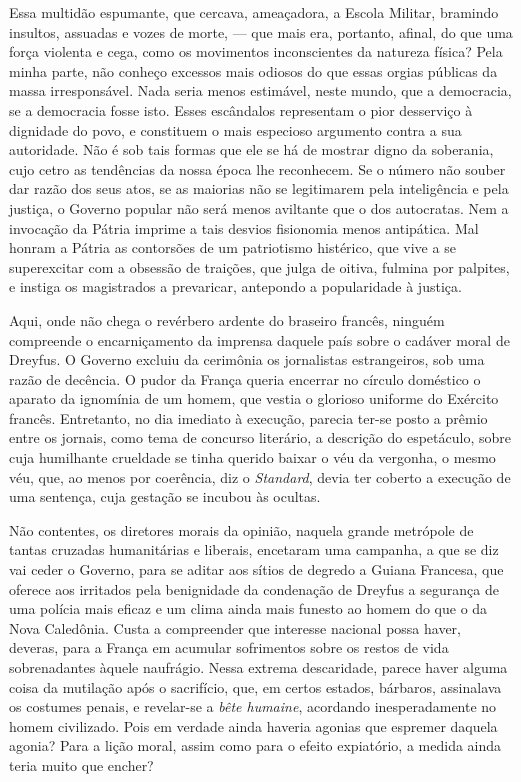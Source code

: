 Essa multidão espumante, que cercava, ameaçadora, a Escola Militar,
bramindo insultos, assuadas e vozes de morte, --- que mais era,
portanto, afinal, do que uma força violenta e cega, como os movimentos
inconscientes da natureza física? Pela minha parte, não conheço
excessos mais odiosos do que essas orgias públicas da massa
irresponsável. Nada seria menos estimável, neste mundo, que a
democracia, se a democracia fosse isto. Esses escândalos representam o
pior desserviço à dignidade do povo, e constituem o mais especioso
argumento contra a sua autoridade. Não é sob tais formas que ele se há
de mostrar digno da soberania, cujo cetro as tendências da nossa época
lhe reconhecem. Se o número não souber dar razão dos seus atos, se as
maiorias não se legitimarem pela inteligência e pela justiça, o Governo
popular não será menos aviltante que o dos autocratas. Nem a invocação
da Pátria imprime a tais desvios fisionomia menos antipática. Mal
honram a Pátria as contorsões de um patriotismo histérico, que vive a
se superexcitar com a obsessão de traições, que julga de oitiva,
fulmina por palpites, e instiga os magistrados a prevaricar,
antepondo a popularidade à justiça.

Aqui, onde não chega o revérbero ardente do braseiro francês, ninguém
compreende o encarniçamento da imprensa daquele país sobre o cadáver
moral de Dreyfus. O Governo excluiu da cerimônia os jornalistas
estrangeiros, sob uma razão de decência. O pudor da França queria
encerrar no círculo doméstico o aparato da ignomínia de um homem, que
vestia o glorioso uniforme do Exército francês. Entretanto, no dia
imediato à execução, parecia ter-se posto a prêmio entre os jornais,
como tema de concurso literário, a descrição do espetáculo, sobre cuja
humilhante crueldade se tinha querido baixar o véu da vergonha, o mesmo
véu, que, ao menos por coerência, diz o \textit{Standard}, devia ter coberto a
execução de uma sentença, cuja gestação se incubou às ocultas.

Não contentes, os diretores morais da opinião, naquela grande metrópole
de tantas cruzadas humanitárias e liberais, encetaram uma campanha, a
que se diz vai ceder o Governo, para se aditar aos sítios de degredo a
Guiana Francesa, que oferece aos irritados pela benignidade da
condenação de Dreyfus a segurança de uma polícia mais eficaz e um clima
ainda mais funesto ao homem do que o da Nova Caledônia. Custa a
compreender que interesse nacional possa haver, deveras, para a França
em acumular sofrimentos sobre os restos de vida sobrenadantes àquele
naufrágio. Nessa extrema descaridade, parece haver alguma coisa da
mutilação após o sacrifício, que, em certos estados, bárbaros,
assinalava os costumes penais, e revelar-se a \textit{bête humaine}, acordando
inesperadamente no homem civilizado. Pois em verdade ainda haveria
agonias que espremer daquela agonia? Para a lição moral, assim como
para o efeito expiatório, a medida ainda teria muito que encher?

